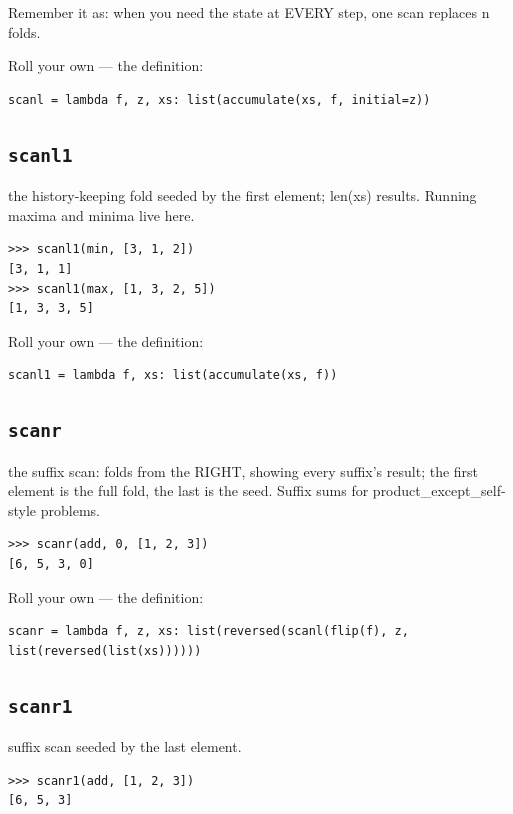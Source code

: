 \documentclass[10pt,letterpaper]{book}
\begin{document}
Remember it as: when you need the state at EVERY step, one scan replaces n folds.


Roll your own --- the definition:

\begin{lstlisting}[style=ex]
scanl = lambda f, z, xs: list(accumulate(xs, f, initial=z))
\end{lstlisting}

\subsection{\texttt{scanl1}}\label{def:scanl1}
the history-keeping fold seeded by the first element; len(xs) results. Running maxima and minima live here.
\begin{lstlisting}[style=ex]
>>> scanl1(min, [3, 1, 2])
[3, 1, 1]
>>> scanl1(max, [1, 3, 2, 5])
[1, 3, 3, 5]
\end{lstlisting}

Roll your own --- the definition:

\begin{lstlisting}[style=ex]
scanl1 = lambda f, xs: list(accumulate(xs, f))
\end{lstlisting}
\subsection{\texttt{scanr}}\label{def:scanr}
the suffix scan: folds from the RIGHT, showing every suffix's result; the first element is the full fold, the last is the seed. Suffix sums for product\_except\_self-style problems.
\begin{lstlisting}[style=ex]
>>> scanr(add, 0, [1, 2, 3])
[6, 5, 3, 0]
\end{lstlisting}

Roll your own --- the definition:

\begin{lstlisting}[style=ex]
scanr = lambda f, z, xs: list(reversed(scanl(flip(f), z, list(reversed(list(xs))))))
\end{lstlisting}

\subsection{\texttt{scanr1}}\label{def:scanr1}
suffix scan seeded by the last element.
\begin{lstlisting}[style=ex]
>>> scanr1(add, [1, 2, 3])
[6, 5, 3]
\end{lstlisting}
\end{document}
